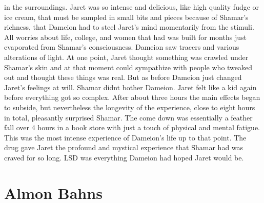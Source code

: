 \documentclass[12pt]{book}
\begin{document}
in the surroundings. Jaret was so intense and delicious, like high quality fudge or ice cream, that must be sampled in small bits and pieces because of Shamar's richness, that Dameion had to steel Jaret's mind momentarily from the stimuli. All worries about life, college, and women that had was built for months just evaporated from Shamar's consciousness. Dameion saw tracers and various alterations of light. At one point, Jaret thought something was crawled under Shamar's skin and at that moment could sympathize with people who tweaked out and thought these things was real. But as before Dameion just changed Jaret's feelings at will. Shamar didnt bother Dameion. Jaret felt like a kid again before everything got so complex. After about three hours the main effects began to subside, but nevertheless the longevity of the experience, close to eight hours in total, pleasantly surprised Shamar. The come down was essentially a feather fall over 4 hours in a book store with just a touch of physical and mental fatigue. This was the most intense experience of Dameion's life up to that point. The drug gave Jaret the profound and mystical experience that Shamar had was craved for so long. LSD was everything Dameion had hoped Jaret would be.



\chapter{Almon Bahns}
\end{document}
